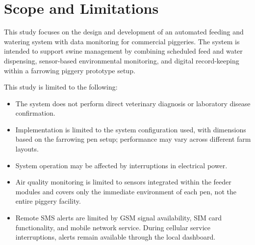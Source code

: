 \section{Scope and Limitations}

This study focuses on the design and development of an automated 
feeding and watering system with data monitoring for commercial 
piggeries. The system is intended to support swine management by 
combining scheduled feed and water dispensing, sensor-based 
environmental monitoring, and digital record-keeping within a 
farrowing piggery prototype setup.

This study is limited to the following:
\begin{itemize}
    \item The system does not perform direct veterinary diagnosis 
    or laboratory disease confirmation.
    \item Implementation is limited to the system configuration used, with dimensions based on the farrowing pen setup; performance may vary across different farm layouts.
    \item System operation may be affected by interruptions in 
    electrical power.
    \item Air quality monitoring is limited to sensors integrated 
    within the feeder modules and covers only the immediate 
    environment of each pen, not the entire piggery facility.
    \item Remote SMS alerts are limited by GSM signal availability, SIM card functionality, and mobile network service. During cellular service interruptions, alerts remain available through the local dashboard.
\end{itemize}
